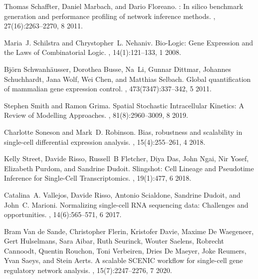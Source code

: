 \documentclass[10pt, a4paper]{article}
\begin{document}
\begin{thebibliography}{10}
	Thomas Schaffter, Daniel Marbach, and Dario Floreano.
	: In silico benchmark generation and performance
	profiling of network inference methods.
	, 27(16):2263--2270, 8 2011.
	
	Maria~J. Schilstra and Chrystopher~L. Nehaniv.
	\newblock Bio-{{Logic}}: {{Gene Expression}} and the {{Laws}} of
	{{Combinatorial Logic}}.
	, 14(1):121--133, 1 2008.
	
	Bj{\"o}rn Schwanh{\"a}usser, Dorothea Busse, Na~Li, Gunnar Dittmar, Johannes
	Schuchhardt, Jana Wolf, Wei Chen, and Matthias Selbach.
	\newblock Global quantification of mammalian gene expression control.
	, 473(7347):337--342, 5 2011.
	
	Stephen Smith and Ramon Grima.
	\newblock Spatial {{Stochastic Intracellular Kinetics}}: {{A Review}} of
	{{Modelling Approaches}}.
	, 81(8):2960--3009, 8 2019.
	
	Charlotte Soneson and Mark~D. Robinson.
	\newblock Bias, robustness and scalability in single-cell differential
	expression analysis.
	, 15(4):255--261, 4 2018.
	
	Kelly Street, Davide Risso, Russell~B Fletcher, Diya Das, John Ngai, Nir Yosef,
	Elizabeth Purdom, and Sandrine Dudoit.
	\newblock Slingshot: {{Cell Lineage}} and {{Pseudotime Inference}} for
	{{Single}}-{{Cell Transcriptomics}}.
	, 19(1):477, 6 2018.
	
	Catalina~A. Vallejos, Davide Risso, Antonio Scialdone, Sandrine Dudoit, and
	John~C. Marioni.
	\newblock Normalizing single-cell {{RNA}} sequencing data: Challenges and
	opportunities.
	, 14(6):565--571, 6 2017.
	
	Bram {Van de Sande}, Christopher Flerin, Kristofer Davie, Maxime {De
		Waegeneer}, Gert Hulselmans, Sara Aibar, Ruth Seurinck, Wouter Saelens,
	Robrecht Cannoodt, Quentin Rouchon, Toni Verbeiren, Dries {De Maeyer}, Joke
	Reumers, Yvan Saeys, and Stein Aerts.
	\newblock A scalable {{SCENIC}} workflow for single-cell gene regulatory
	network analysis.
	, 15(7):2247--2276, 7 2020.
	

\end{thebibliography}
\end{document}

